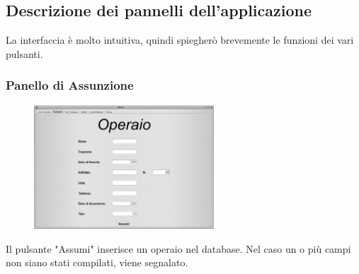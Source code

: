\documentclass{article}
\begin{document}
\subsection{Descrizione dei pannelli dell'applicazione}
La interfaccia è molto intuitiva, quindi spiegherò brevemente le funzioni dei vari pulsanti.
\subsubsection{Panello di Assunzione}
\begin{figure}[htbp]
\centering
\includegraphics[width=0.6\textwidth]{img/panel_assunzioni.png}
\end{figure}
Il pulsante "Assumi" inserisce un operaio nel database. Nel caso un o più campi non siano stati compilati, viene segnalato.
\end{document}
